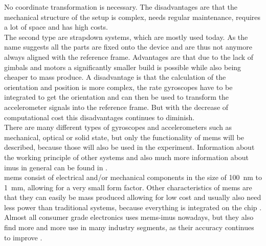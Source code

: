 No coordinate transformation is necessary.
The disadvantages are that the mechanical structure of the setup is complex, needs regular maintenance, requires a lot of space and has high costs.\\
The second type are strapdown systems, which are mostly used today.
As the name suggests all the parts are fixed onto the device and are thus not anymore always aligned with the reference frame.
Advantages are that due to the lack of gimbals and motors a significantly smaller build is possible while also being cheaper to mass produce.
A disadvantage is that the calculation of the orientation and position is more complex, the rate gyroscopes have to be integrated to get the orientation and can then be used to transform the accelerometer signals into the reference frame.
But with the decrease of computational cost this disadvantages continues to diminish.\\
There are many different types of gyroscopes and accelerometers such as mechanical, optical or solid state, but only the functionality of \gls{mems} will be described, because those will also be used in the experiment.
Information about the working principle of other systems and also much more information about \gls{imu}s in general can be found in \cite{Woodman07anintroduction}.\\
\gls{mems} consist of electrical and/or mechanical components in the size of \SI{100}{\nano\metre} to \SI{1}{\milli\metre}, allowing for a very small form factor.
Other characteristics of \gls{mems} are that they can easily be mass produced allowing for low cost and usually also need less power than traditional systems, because everything is integrated on the chip \cite{Shaeffer2013}.
Almost all consumer grade electronics uses \gls{mems}-\gls{imu}s nowadays, but they also find more and more use in many industry segments, as their accuracy continues to improve \cite{Perlmutter2016}.

